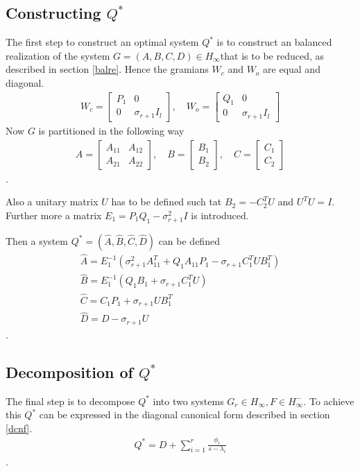\subsection{Constructing \(Q^{*}\)}
The first step to construct an optimal system \(Q^{*}\) is to construct an balanced realization of the system \(G = (A, B, C, D) \in H_{\infty}\)that is to be reduced, as described in section \ref{balre}.
Hence the gramians \(W_c\) and \(W_o\) are equal and diagonal.
\begin{gather}
W_c = \begin{bmatrix}
P_1 & 0 \\
0 & \sigma_{r+1}I_l
\end{bmatrix}, \quad
W_o = \begin{bmatrix}
Q_1 & 0 \\
0 & \sigma_{r+1}I_l
\end{bmatrix}
\end{gather}
Now \(G\) is partitioned in the following way
\begin{gather}
A = \begin{bmatrix}
A_{11} & A_{12} \\
A_{21} & A_{22}
\end{bmatrix}, \quad 
B = \begin{bmatrix}
B_{1}  \\
B_{2} 
\end{bmatrix}, \quad 
C = \begin{bmatrix}
C_{1}  \\
C_{2} 
\end{bmatrix}
\end{gather}
.

Also a unitary matrix \(U\) has to be defined such tat \(B_2 = -C_2^TU\) and \(U^TU = I\). 
Further more a matrix \(E_1 = P_1Q_1-\sigma_{r+1}^2I\) is introduced.

Then a system \(Q^* = (\hat{A}, \hat{B}, \hat{C}, \hat{D})\) can be defined
\begin{gather}
\hat{A} = E_1^{-1}(\sigma_{r+1}^2A_{11}^T + Q_1 A_{11}P_1 - \sigma_{r+1}C_1^TUB_1^T) \\
\hat{B} = E_1^{-1}(Q_1B_1 + \sigma_{r+1}C_1^TU)\\
\hat{C} = C_1P_1 + \sigma_{r+1}UB_1^T \\
\hat{D} = D - \sigma_{r+1}U
\end{gather}
.
\cite{sandberg}

\subsection{Decomposition of \(Q^{*}\)}
The final step is to decompose \(Q^{*}\) into two systems \(G_r \in H_{\infty}, F \in H_{\infty}^{-}\).
To achieve this \(Q^{*}\) can be expressed in the diagonal canonical form described in section \ref{dcnf}.
\begin{gather}
Q^{*} = D + \sum_{i=1}^{r} \frac{\phi_i}{s-\lambda_i} 
\end{gather}
.


